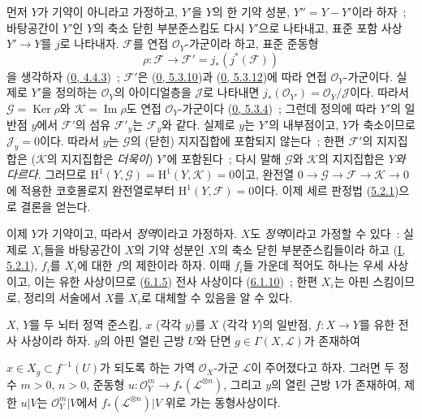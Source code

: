 먼저 $Y$가 기약이 아니라고 가정하고, $Y'$을 $Y$의 한 기약 성분,
$Y''=Y-Y'$이라 하자~; 바탕공간이 $Y'$인 $Y$의 축소 닫힌
부분준스킴도 다시 $Y'$으로 나타내고, 표준 포함 사상 $Y'\to Y$를 $j$로
나타내자. $\mathcal{F}$를 연접 $\mathcal{O}_Y$-가군이라 하고, 표준
준동형
\[
\rho:\mathcal{F}\longrightarrow
\mathcal{F}'=j_*(j^*(\mathcal{F}))
\]
을 생각하자 (\hyperref[0.4.4.3-ko]{0, 4.4.3})~;
$\mathcal{F}'$은 (\hyperref[0.5.3.10-ko]{0, 5.3.10})과
(\hyperref[0.5.3.12-ko]{0, 5.3.12})에 따라 연접
$\mathcal{O}_Y$-가군이다. 실제로 $Y'$을 정의하는
$\mathcal{O}_Y$의 아이디얼층을 $\mathcal{J}$로 나타내면
$j_*(\mathcal{O}_{Y'})=\mathcal{O}_Y/\mathcal{J}$이다. 따라서
$\mathcal{G}=\operatorname{Ker}\rho$와
$\mathcal{K}=\operatorname{Im}\rho$도 연접 $\mathcal{O}_Y$-가군이다
(\hyperref[0.5.3.4-ko]{0, 5.3.4})~; 그런데 정의에 따라 $Y'$의 일반점
$y$에서 $\mathcal{F}'$의 섬유 $\mathcal{F}'_y$는
$\mathcal{F}_y$와 같다. 실제로 $y$는 $Y'$의 내부점이고, $Y$가
축소이므로 $\mathcal{J}_y=0$이다. 따라서 $y$는 $\mathcal{G}$의
(닫힌) 지지집합에 포함되지 않는다~; 한편 $\mathcal{F}'$의 지지집합은
($\mathcal{K}$의 지지집합은 \emph{더욱이}) $Y'$에 포함된다~; 다시 말해
$\mathcal{G}$와 $\mathcal{K}$의 지지집합은 \emph{$Y$와 다르다}.
그러므로
$\mathrm{H}^1(Y,\mathcal{G})=\mathrm{H}^1(Y,\mathcal{K})=0$이고,
완전열 $0\to\mathcal{G}\to\mathcal{F}\to\mathcal{K}\to0$에 적용한
코호몰로지 완전열로부터 $\mathrm{H}^1(Y,\mathcal{F})=0$이다. 이제
세르 판정법 (\hyperref[II.5.2.1-ko]{5.2.1})으로 결론을 얻는다.

이제 $Y$가 기약이고, 따라서 \emph{정역}이라고 가정하자. $X$도
\emph{정역}이라고 가정할 수 있다~: 실제로 $X_i$들을 바탕공간이 $X$의
기약 성분인 $X$의 축소 닫힌 부분준스킴들이라 하고
(\hyperref[I.5.2.1-ko]{I, 5.2.1}), $f_i$를 $X_i$에 대한 $f$의
제한이라 하자. 이때 $f_i$들 가운데 적어도 하나는 우세 사상이고, 이는
유한 사상이므로 (\hyperref[II.6.1.5-ko]{6.1.5}) 전사 사상이다
(\hyperref[II.6.1.10-ko]{6.1.10})~; 한편 $X_i$는 아핀 스킴이므로,
정리의 서술에서 $X$를 $X_i$로 대체할 수 있음을 알 수 있다.

\begin{lemma}[6.7.1.1]
\label{II.6.7.1.1-ko}
$X$, $Y$를 두 뇌터 정역 준스킴, $x$ (각각 $y$)를 $X$ (각각 $Y$)의
일반점, $f:X\to Y$를 유한 전사 사상이라 하자. $y$의 아핀 열린 근방
$U$와 단면 $g\in\Gamma(X,\mathcal{L})$가 존재하여


$x\in X_g\subset f^{-1}(U)$가 되도록 하는 가역 $\mathcal{O}_X$-가군
$\mathcal{L}$이 주어졌다고 하자. 그러면 두 정수 $m>0$, $n>0$, 준동형
$u:\mathcal{O}_Y^m\to f_*(\mathcal{L}^{\otimes n})$, 그리고 $y$의 열린
근방 $V$가 존재하여, 제한 $u|V$는 $\mathcal{O}_Y^m|V$에서
$f_*(\mathcal{L}^{\otimes n})|V$ 위로 가는 동형사상이다.
\end{lemma}

